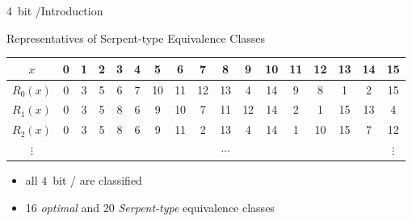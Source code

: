\begin{frame}{4~bit \subboxes/}{Introduction}
	\begin{block}{Representatives of Serpent-type Equivalence Classes}
		\centering
		\vspace{1em}
		\setlength{\tabcolsep}{4pt}
		\begin{tabular}{ccccccccccccccccc}
			\toprule
			$x$      & 0& 1& 2& 3& 4& 5& 6& 7& 8& 9&10&11&12&13&14&15\\\midrule
			$R_0(x)$ & 0& 3& 5& 6& 7&10&11&12&13& 4&14& 9& 8& 1& 2&15\\
			$R_1(x)$ & 0& 3& 5& 8& 6& 9&10& 7&11&12&14& 2& 1&15&13& 4\\
			$R_2(x)$ & 0& 3& 5& 8& 6& 9&11& 2&13& 4&14& 1&10&15& 7&12\\
			$\vdots$ & & & & & & & & & $\cdots$ & & & & & & & $\vdots$\\
			\bottomrule
		\end{tabular}
		\vspace{1em}
	\end{block}
	\begin{itemize}
		\item all $4$~bit \subboxes/ are classified
		\item 16 \emph{optimal} and 20 \emph{Serpent-type} equivalence classes
	\end{itemize}
\end{frame}

